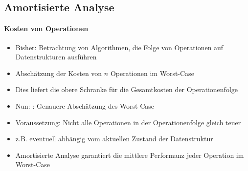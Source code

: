 \documentclass[
    ngerman,
    color=3b,
    dark_mode,
    load_common, %
    summary,
    boxarc,
]{tuda_summary}
\begin{document}
\clearpage

\subsection{Amortisierte Analyse}
\paragraph{Kosten von Operationen}
\begin{itemize}
    \item Bisher: Betrachtung von Algorithmen, die Folge von Operationen auf Datenstrukturen ausführen
    \item Abschätzung der Kosten von $n$ Operationen im Worst-Case
    \item Dies liefert die obere Schranke für die Gesamtkosten der Operationenfolge
    \item Nun: : Genauere Abschätzung des Worst Case
    \item Voraussetzung: Nicht alle Operationen in der Operationenfolge gleich teuer
    \item z.B. eventuell abhängig vom aktuellen Zustand der Datenstruktur
    \item Amortisierte Analyse garantiert die mittlere Performanz jeder Operation im Worst-Case
\end{itemize}
\end{document}
